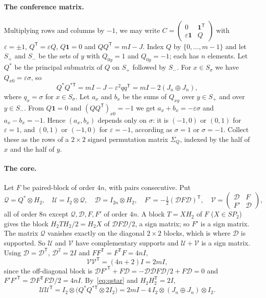 \documentclass[10pt]{article}
\theoremstyle{definition}
\theoremstyle{remark}
\newcommand{\tr}{^{\mathsf T}}
\newcommand{\one}{\mathbf 1}
\newcommand{\cQ}{\mathcal Q}
\newcommand{\cU}{\mathcal U}
\newcommand{\cV}{\mathcal V}
\newcommand{\cD}{\mathcal D}
\begin{document}
\paragraph{The conference matrix.} Multiplying rows and columns by $-1$, we may write $C=\left(\begin{smallmatrix}0&\one\tr\\ \varepsilon\one&Q\end{smallmatrix}\right)$ with $\varepsilon=\pm1$, $Q\tr=\varepsilon Q$, $Q\one=0$ and $QQ\tr=mI-J$. Index $Q$ by $\{0,\dots,m-1\}$ and let $S_+$ and $S_-$ be the sets of $y$ with $Q_{0y}=1$ and $Q_{0y}=-1$; each has $n$ elements. Let $Q^*$ be the principal submatrix of $Q$ on $S_+$ followed by $S_-$. For $x\in S_\sigma$ we have $Q_{x0}=\varepsilon\sigma$, so
\begin{equation}\label{eq:qstar}
Q^*Q^{*\mathsf T}=mI-J-\varepsilon^2 qq\tr=mI-2(J_n\oplus J_n),
\end{equation}
where $q_x=\sigma$ for $x\in S_\sigma$. Let $a_x$ and $b_x$ be the sums of $Q_{xy}$ over $y\in S_+$ and over $y\in S_-$. From $Q\one=0$ and $(QQ\tr)_{x0}=-1$ we get $a_x+b_x=-\varepsilon\sigma$ and $a_x-b_x=-1$. Hence $(a_x,b_x)$ depends only on $\sigma$: it is $(-1,0)$ or $(0,1)$ for $\varepsilon=1$, and $(0,1)$ or $(-1,0)$ for $\varepsilon=-1$, according as $\sigma=1$ or $\sigma=-1$. Collect these as the rows of a $2\times2$ signed permutation matrix $\Sigma_Q$, indexed by the half of $x$ and the half of $y$.

\paragraph{The core.} Let $F$ be paired-block of order $4n$, with pairs consecutive. Put
\[
\cQ=Q^*\otimes H_2,\quad \cU=I_2\otimes\cQ,\quad \cD=I_{2n}\otimes H_2,\quad F'=-\tfrac12(\cD F\cD)\tr,\quad \cV=\begin{pmatrix}\cD&F\\ F'&\cD\end{pmatrix},
\]
all of order $8n$ except $\cQ,\cD,F,F'$ of order $4n$. A block $T=XH_2$ of $F$ ($X\in SP_2$) gives the block $H_2TH_2/2=H_2X$ of $\cD F\cD/2$, a sign matrix; so $F'$ is a sign matrix. The matrix $\cQ$ vanishes exactly on the diagonal $2\times2$ blocks, which is where $\cD$ is supported. So $\cU$ and $\cV$ have complementary supports and $\cU+\cV$ is a sign matrix. Using $\cD=\cD\tr$, $\cD^2=2I$ and $FF\tr=F\tr F=4nI$,
\begin{equation}\label{eq:VV}
\cV\cV\tr=(4n+2)I=2mI,
\end{equation}
since the off-diagonal block is $\cD F'^{\mathsf T}+F\cD=-\cD\cD F\cD/2+F\cD=0$ and $F'F'^{\mathsf T}=\cD F\tr F\cD/2=4nI$. By~\eqref{eq:qstar} and $H_2H_2\tr=2I$,
\begin{equation}\label{eq:UU}
\cU\cU\tr=I_2\otimes\bigl(Q^*Q^{*\mathsf T}\otimes2I_2\bigr)=2mI-4\,I_2\otimes(J_n\oplus J_n)\otimes I_2 .
\end{equation}
\end{document}
